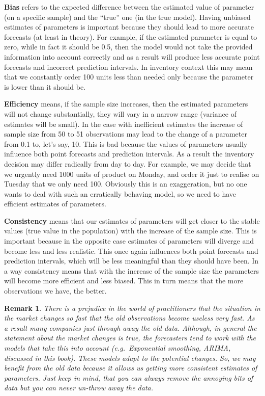 \documentclass[]{book}
\newtheorem*{remark}{Remark}
\begin{document}
\textbf{Bias} refers to the expected difference between the estimated value of parameter (on a specific sample) and the ``true'' one (in the true model). Having unbiased estimates of parameters is important because they should lead to more accurate forecasts (at least in theory). For example, if the estimated parameter is equal to zero, while in fact it should be 0.5, then the model would not take the provided information into account correctly and as a result will produce less accurate point forecasts and incorrect prediction intervals. In inventory context this may mean that we constantly order 100 units less than needed only because the parameter is lower than it should be.

\textbf{Efficiency} means, if the sample size increases, then the estimated parameters will not change substantially, they will vary in a narrow range (variance of estimates will be small). In the case with inefficient estimates the increase of sample size from 50 to 51 observations may lead to the change of a parameter from 0.1 to, let's say, 10. This is bad because the values of parameters usually influence both point forecasts and prediction intervals. As a result the inventory decision may differ radically from day to day. For example, we may decide that we urgently need 1000 units of product on Monday, and order it just to realise on Tuesday that we only need 100. Obviously this is an exaggeration, but no one wants to deal with such an erratically behaving model, so we need to have efficient estimates of parameters.

\textbf{Consistency} means that our estimates of parameters will get closer to the stable values (true value in the population) with the increase of the sample size. This is important because in the opposite case estimates of parameters will diverge and become less and less realistic. This once again influences both point forecasts and prediction intervals, which will be less meaningful than they should have been. In a way consistency means that with the increase of the sample size the parameters will become more efficient and less biased. This in turn means that the more observations we have, the better.

\begin{remark}
There is a prejudice in the world of practitioners that the situation in
the market changes so fast that the old observations become useless very
fast. As a result many companies just through away the old data.
Although, in general the statement about the market changes is true, the
forecasters tend to work with the models that take this into account
(e.g.~Exponential smoothing, ARIMA, discussed in this book). These
models adapt to the potential changes. So, we may benefit from the old
data because it allows us getting more consistent estimates of
parameters. Just keep in mind, that you can always remove the annoying
bits of data but you can never un-throw away the data.
\end{remark}
\end{document}
